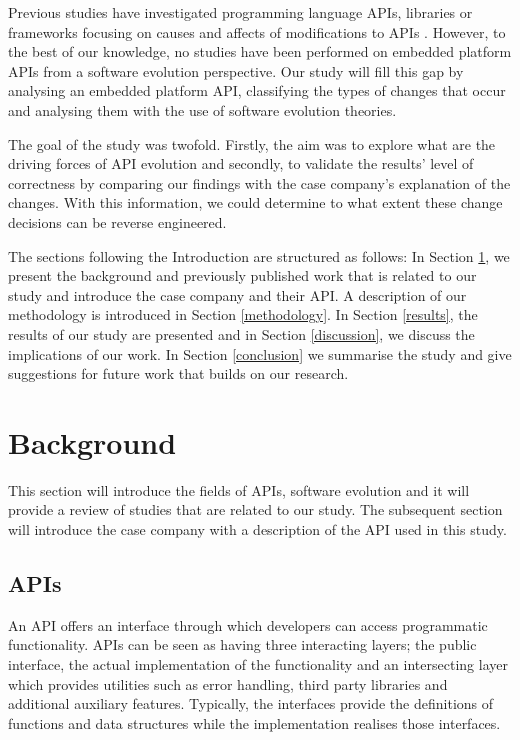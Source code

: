 \documentclass{sig-alternate}
\begin{document}
Previous studies have investigated programming language APIs, libraries or frameworks focusing on causes and affects of modifications to APIs \cite{dig2005role, hou2011exploring, shi2011empirical}. However, to the best of our knowledge, no studies have been performed on embedded platform APIs from a software evolution perspective. Our study will fill this gap by analysing an embedded platform API, classifying the types of changes that occur and analysing them with the use of software evolution theories.

The goal of the study was twofold. Firstly, the aim was to explore what are the driving forces of API evolution and secondly, to validate the results' level of correctness by comparing our findings with the case company's explanation of the changes. With this information, we could determine to what extent these change decisions can be reverse engineered. 

 \newpage
The sections following the Introduction are structured as follows: In Section \ref{background}, we present the background and previously published work that is related to our study and introduce the case company and their API. A description of our methodology is introduced in Section \ref{methodology}. In Section \ref{results}, the results of our study are presented and in Section \ref{discussion}, we discuss the implications of our work. In Section \ref{conclusion} we summarise the study and give suggestions for future work that builds on our research. 

\section{Background} \label{background}
This section will introduce the fields of APIs, software evolution and it will provide a review of studies that are related to our study. The subsequent section will introduce the case company with a description of the API used in this study.  

\subsection{APIs} \label{api_design}
An API offers an interface through which developers can access programmatic functionality. APIs can be seen as having three interacting layers; the public interface, the actual implementation of the functionality and an intersecting layer which provides utilities such as error handling, third party libraries and additional auxiliary features. Typically, the interfaces provide the definitions of functions and data structures while the implementation realises those interfaces.
\end{document}
